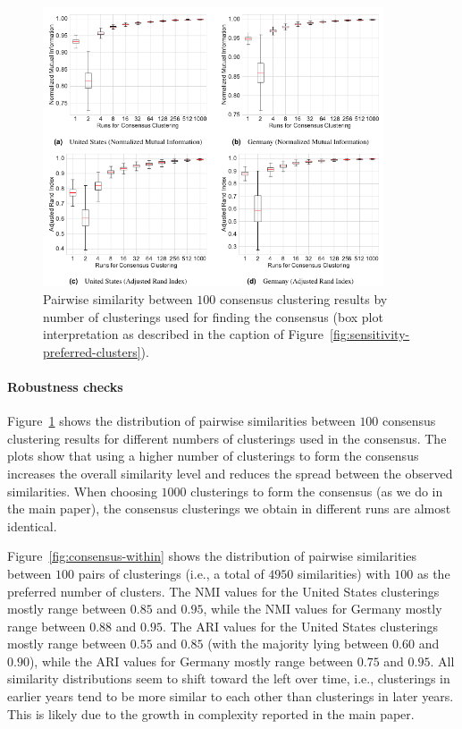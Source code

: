 \documentclass[utf8,sort&compress,numbers,square,table,hidelinks]{frontiers_suppmat} %
\begin{document}
\begin{figure}
	\center
	\includegraphics[width=0.9\textwidth]{figure_si_variance_impact_of_consensus_clustering.pdf}
	\caption{Pairwise similarity between $100$ consensus clustering results by number of clusterings used for finding the consensus (box plot interpretation as described in the caption of Figure~\ref{fig:sensitivity-preferred-clusters}).}
	\label{fig:consensus-effect}
\end{figure}

\vspace*{6pt}
\paragraph{Robustness checks}

Figure~\ref{fig:consensus-effect} shows the distribution of pairwise similarities between $100$ consensus clustering results for different numbers of clusterings used in the consensus. 
The plots show that using a higher number of clusterings to form the consensus increases the overall similarity level and reduces the spread between the observed similarities. 
When choosing $1000$ clusterings to form the consensus (as we do in the main paper), 
the consensus clusterings we obtain in different runs are almost identical.

Figure~\ref{fig:consensus-within} shows the distribution of pairwise similarities between $100$ pairs of clusterings (i.e., a total of $4950$ similarities) with $100$ as the preferred number of clusters. 
The NMI values for the United States clusterings mostly range between $0.85$ and $0.95$, while the NMI values for Germany mostly range between $0.88$ and $0.95$. 
The ARI values for the United States clusterings mostly range between $0.55$ and $0.85$ (with the majority lying between $0.60$ and $0.90$), 
while the ARI values for Germany mostly range between $0.75$ and $0.95$.
All similarity distributions seem to shift toward the left over time, 
i.e., clusterings in earlier years tend to be more similar to each other than clusterings in later years. 
This is likely due to the growth in complexity reported in the main paper.
\end{document}
